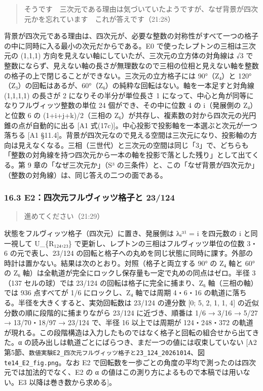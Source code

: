 \documentclass[
  a4paper,
]{ltjsarticle}
\begin{document}
\begin{quote}
そうです　三次元である理由は気づいていたようですが、なぜ背景が四次元かを忘れています　これが答えです（21:28）
\end{quote}

背景が四次元である理由は、四次元が、必要な整数の対称性がすべて一つの格子の中に同時に入る最小の次元だからである。E0
で使ったレプトンの三相は三次元の (1,1,1)
方向を見えない軸にしていたが、三次元の立方体の対角線は √3
で整数にならず、見えない軸の長さが無理数なので三相の位相と見えない軸を整数の格子の上で閉じることができない。三次元の立方格子には
90°（Z₄）と
120°（Z₃）の回転はあるが、60°（Z₆）の純粋な回転はない。軸を一本足すと対角線
(1,1,1,1) の長さが 2 になりその半分が単位長さ 1
になって、中心と角が同等になりフルヴィッツ整数の単位 24
個ができ、その中に位数 4 の i（発展側の Z₄）と位数 6 の
(1+i+j+k)/2（三相の
Z₆）が共存し、複素数の対から四次元の光円錐の点が自動的に出る {[}A1
式(17c){]}。中心投影で投影軸を一本選ぶと次元が一つ落ちる {[}A1
§11.4{]}。背景が四次元なので見える空間は三次元になり、投影軸の方向は見えなくなる。三相（三世代）と三次元の空間は同じ「3」で、どちらも「整数の対角線を持つ四次元から一本の軸を投影で落とした残り」として出てくる。第
9 章の「なぜ三次元か」（S³
の三条件）と、この「なぜ背景が四次元か」（整数の対角線）は、同じ答えの二つの面である。

\subsubsection{16.3 E2：四次元フルヴィッツ格子と
23/124}\label{e2ux56dbux6b21ux5143ux30d5ux30ebux30f4ux30a3ux30c3ux30c4ux683cux5b50ux3068-23124}

\begin{quote}
進めてください（21:29）
\end{quote}

状態をフルヴィッツ格子（四次元）に置き、発展側は λₐ³¹ = i を四元数の i
と同一視して U\_\{R₁₂₄,₂₃\}
で更新し、レプトンの三相はフルヴィッツ単位の位数 3・6 の元で表し、23/124
の回転と格子への丸めを同じ状態に同時に課す。外部の時計は置かない。結果は次のとおり。対照（格子と両立する
90° の Z₄ 軸と 60° の Z₆
軸）は全軌道が完全にロックし保存量も一定で丸めの同点はゼロ。半径 3（137
セルの球）では 23/124 の回転は格子に完全に捕まり、Z₆ 軸（三相の軸）では
936 点すべてが 1/6 にロックし、Z₄ 軸では周期 4・6・16
の軌道に落ちる。半径を大きくすると、実効回転数は 23/124 の連分数 {[}0;
5, 2, 1, 1, 4{]} の近似分数の順に段階的に捕まりながら 23/124
に近づき、順番は 1/6 → 3/16 → 5/27 → 13/70・18/97 → 23/124 で、半径 16
以上では周期が 124・248・372
の軌道が現れる。この段階構造は入力したものではなく格子と回転の組合せから出てきた。α
の読み出しは軌道ごとにばらつき、まだ一つの値には収束していない {[}A2
第5節、\texttt{数値実験E2\_\allowbreak{}四次元フルヴィッツ格子と23\_\allowbreak{}124\_\allowbreak{}20261014}、図
\texttt{te14\_\allowbreak{}E2\_\allowbreak{}fig.png}。なお E2
で回転数を一歩ごとの角度の平均で測ったのは四次元では加法的でなく、E2 の
α の値はこの測り方によるもので本稿では用いない。E3
以降は巻き数から求める{]}。
\end{document}
